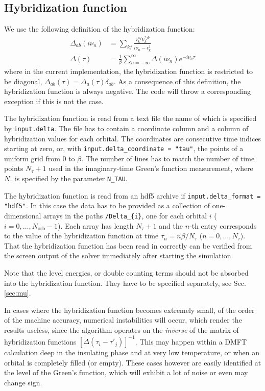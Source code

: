 \documentclass[aps,prb,floatfix,superscriptaddress,twocolumn,notitlepage]{revtex4-1}
\newcommand{\iom}{{\ensuremath{i\nu}}}
\begin{document}
\subsection{Hybridization function}
\label{hybridization}
We use the following definition of the hybridization function:
\begin{align}
\Delta_{ab}(\iom_{n}) &= \sum_{kj}\frac{V_{k}^{aj}V_{k}^{*jb}}{\iom_{n}-\epsilon_{k}^{j}}\\
\Delta(\tau) &= \frac{1}{\beta}\sum_{n=-\infty}^{\infty}\Delta(\iom_{n})e^{-\iom_{n}\tau}
\end{align}
where in the current implementation, the hybridization function is restricted to be diagonal, $\Delta_{ab}(\tau)=\Delta_{a}(\tau)\delta_{ab}$.
As a consequence of this definition, the hybridization function is always negative. The code will throw a corresponding exception if this is not the case.

The hybridization function is read from a text file the name of which is specified by \verb#input.delta#. The file has to contain a coordinate column and a column of hybridization values for each orbital. The coordinates are consecutive time indices starting at zero, or, with \verb#input.delta_coordinate = "tau"#, the points of a uniform grid from $0$ to $\beta$. The number of lines has to match the number of time points $N_{\tau}+1$ used in the imaginary-time Green's function measurement, where $N_{\tau}$ is specified by the parameter \verb#N_TAU#.

The hybridization function is read from an hdf5 archive if \verb#input.delta_format = "hdf5"#. In this case the data has to be provided as a collection of one-dimensional arrays in the paths \verb#/Delta_{i}#, one for each orbital $i$ ($i=0,\ldots,N_{\text{orb}}-1$). Each array has length $N_{\tau}+1$ and the $n$-th entry corresponds to the value of the hybridization function at time $\tau_{n}=n\beta/N_{\tau}$ ($n=0,\ldots,N_{\tau}$).
That the hybridization function has been read in correctly can be verified from the screen output of the solver immediately after starting the simulation.

Note that the level energies, or double counting terms should not be absorbed into the hybridization function. They have to be specified separately, see Sec. \ref{sec:mu}.

In cases where the hybridization function becomes extremely small, of the order of the machine accuracy, numerical instabilities will occur, which render the results useless, since the algorithm operates on the \emph{inverse} of the matrix of hybridization functions $[\Delta(\tau_{i}-\tau'_{j})]^{-1}$.
This may happen within a DMFT calculation deep in the insulating phase and at very low temperature, or when an orbital is completely filled (or empty).
These cases however are easily identified at the level of the Green's function, which will exhibit a lot of noise or even may change sign.
\end{document}
